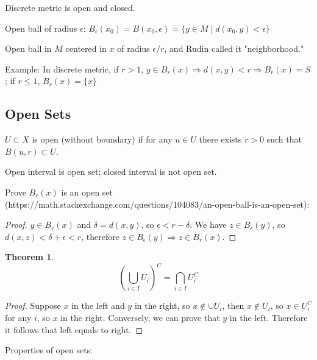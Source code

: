 \documentclass{article}
\newtheorem*{theorem}{Theorem}
\begin{document}
        Discrete metric is open and closed.

        Open ball of radius $\epsilon$:
        $B_{\epsilon}(x_{0}) = B(x_{0}, \epsilon) = \{ y \in M \mid d(x_{0}, y) < \epsilon \}$
        
        Open ball in $M$ centered in $x$ of radius $\epsilon / r$, and Rudin called it "neighborhood."
        
        Example: In discrete metric, if $r > 1$, $y \in B_{r}(x) \Rightarrow d(x, y) < r \Rightarrow B_{r}(x) = S$; if $r \leq 1$, $B_{r}(x) = \{ x \}$

        \subsection{Open Sets}

        $U \subset X$ is open (without boundary) if for any $u \in U$ there exists $r > 0$ such that $B(u, r) \subset U$.

        Open interval is open set; closed interval is not open set.
        
        Prove $B_{r}(x)$ is an open set (https://math.stackexchange.com/questions/104083/an-open-ball-is-an-open-set):
        
        \begin{proof}
            $y \in B_{r}(x)$ and $\delta = d(x, y)$, so $\epsilon < r - \delta$. We have $z \in B_{\epsilon}(y)$, so $d(x, z) < \delta + \epsilon < r$, therefore $z \in B_{\epsilon}(y) \Rightarrow z \in B_{r}(x)$.
        \end{proof}
    
        \begin{theorem}
            \begin{displaymath}
                (\bigcup_{i \in I} U_{i})^{C} = \bigcap_{i \in I} U_{i}^{C}
            \end{displaymath}
        \end{theorem}
    
        \begin{proof}
            Suppose $x$ in the left and $y$ in the right, so $x \notin \cup U_{i}$, then $x \notin U_{i}$, so $x \in U_{i}^{C}$ for any $i$, so $x$ in the right. Conversely, we can prove that $y$ in the left. Therefore it follows that left equals to right.
        \end{proof}
    
        Properties of open sets:
        
\end{document}
